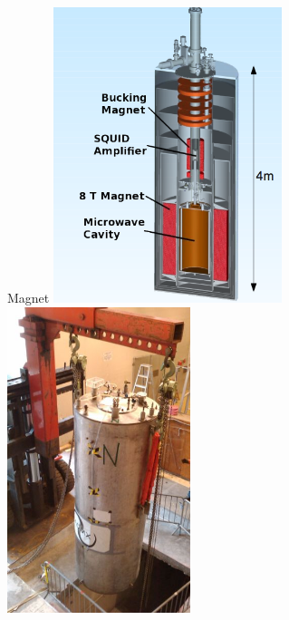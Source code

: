 \documentclass{beamer}
\begin{document}
\begin{frame}{Magnet}
\includegraphics[width=0.5\textwidth]{admx_schematic} \quad \includegraphics[width=0.4\textwidth]{magnet_lowered}

\end{frame}
\end{document}
